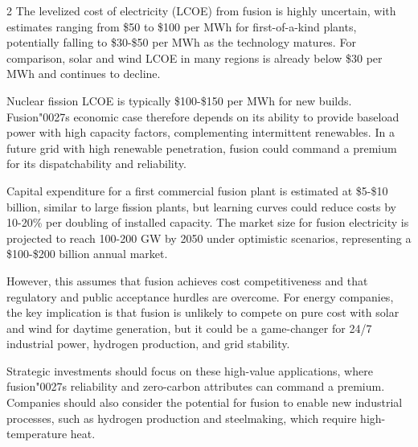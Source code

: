 \documentclass[10pt,a4paper]{article}
\newcommand{\BOApos}{{\BOQuoteFont\char"0027}}
\begin{document}
\begin{multicols}{2}
{\small The levelized cost of electricity (LCOE) from fusion is highly uncertain, with estimates ranging from \$50 to \$100 per MWh for first-of-a-kind plants, potentially falling to \$30-\$50 per MWh as the technology matures. For comparison, solar and wind LCOE in many regions is already below \$30 per MWh and continues to decline.}\par
{\small Nuclear fission LCOE is typically \$100-\$150 per MWh for new builds. Fusion\BOApos{}s economic case therefore depends on its ability to provide baseload power with high capacity factors, complementing intermittent renewables. In a future grid with high renewable penetration, fusion could command a premium for its dispatchability and reliability.}\par
{\small Capital expenditure for a first commercial fusion plant is estimated at \$5-\$10 billion, similar to large fission plants, but learning curves could reduce costs by 10-20\% per doubling of installed capacity. The market size for fusion electricity is projected to reach 100-200 GW by 2050 under optimistic scenarios, representing a \$100-\$200 billion annual market.}\par
{\small However, this assumes that fusion achieves cost competitiveness and that regulatory and public acceptance hurdles are overcome. For energy companies, the key implication is that fusion is unlikely to compete on pure cost with solar and wind for daytime generation, but it could be a game-changer for 24/7 industrial power, hydrogen production, and grid stability.}\par
{\small Strategic investments should focus on these high-value applications, where fusion\BOApos{}s reliability and zero-carbon attributes can command a premium. Companies should also consider the potential for fusion to enable new industrial processes, such as hydrogen production and steelmaking, which require high-temperature heat.}\par
\end{multicols}
\label{chap:3:end}
\end{document}
